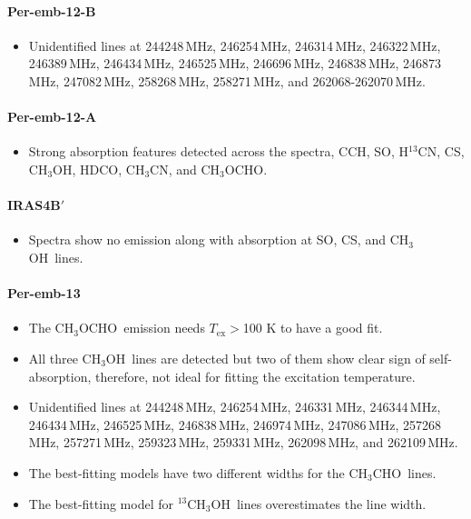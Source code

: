 \documentclass[twocolumn]{aastex62}
\newcommand{\mhz}{\mbox{\,MHz}}
\newcommand{\htcn}{\mbox{H$^{13}$CN}}
\newcommand{\methylformate}{\mbox{CH$_{3}$OCHO}}
\newcommand{\methanol}{\mbox{CH$_{3}$OH}}
\newcommand{\tmethanol}{\mbox{$^{13}$CH$_{3}$OH}}
\newcommand{\acetaldehyde}{\mbox{CH$_{3}$CHO}}
\newcommand{\methylcyanide}{\mbox{CH$_{3}$CN}}
\begin{document}
\paragraph{Per-emb-12-B}
\begin{itemize}
  \item Unidentified lines at 244248\mhz, 246254\mhz, 246314\mhz, 246322\mhz, 246389\mhz, 246434\mhz, 246525\mhz, 246696\mhz, 246838\mhz, 246873\mhz, 247082\mhz, 258268\mhz, 258271\mhz, and 262068-262070\mhz.
\end{itemize}

\paragraph{Per-emb-12-A}
\begin{itemize}
  \item Strong absorption features detected across the spectra, CCH, SO, \htcn, CS, \methanol, HDCO, \methylcyanide, and \methylformate.
\end{itemize}

\paragraph{IRAS4B$\prime$}
\begin{itemize}
  \item Spectra show no emission along with absorption at SO, CS, and \methanol\ lines.
\end{itemize}

\paragraph{Per-emb-13}
\begin{itemize}
  \item The \methylformate\ emission needs $T_\text{ex} > $100 K to have a good fit.
  \item All three \methanol\ lines are detected but two of them show clear sign of self-absorption, therefore, not ideal for fitting the excitation temperature.
  \item Unidentified lines at 244248\mhz, 246254\mhz, 246331\mhz, 246344\mhz, 246434\mhz, 246525\mhz, 246838\mhz, 246974\mhz, 247086\mhz, 257268\mhz, 257271\mhz, 259323\mhz, 259331\mhz, 262098\mhz, and 262109\mhz.
  \item The best-fitting models have two different widths for the \acetaldehyde\ lines.  
  \item The best-fitting model for \tmethanol\ lines overestimates the line width. 
\end{itemize}
\end{document}
